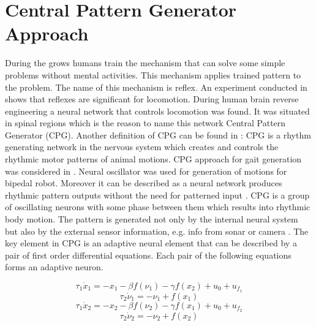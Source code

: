 \documentclass[12pt,a4paper]{report}
\begin{document}
	\section{Central Pattern Generator Approach}
		During the grows humans train the mechanism that can solve some simple problems without mental activities. This mechanism applies trained pattern to the problem. The name of this mechanism is reflex.
		An experiment conducted in \cite{grillner1975locomotion} shows that reflexes are significant for locomotion. During human brain reverse engineering a neural network that controls locomotion was found. It was situated in spinal regions which is the reason to name this network Central Pattern Generator (CPG).
		Another definition of CPG can be found in \cite{lee2007construction}: CPG is a rhythm generating network in the nervous system which creates and controls the rhythmic motor patterns of animal motions. CPG approach for gait generation was considered in \cite{miyakoshi1998three}. Neural oscillator was used for generation of motions for bipedal robot. Moreover it can be described as a neural network produces rhythmic pattern outputs without the need for patterned input \cite{wright2014intelligent}. CPG is a group of oscillating neurons with some phase between them which results into rhythmic body motion. The pattern is generated not only by the internal neural system but also by the external sensor information, e.g. info from sonar or camera \cite{miyakoshi1998three}. The key element in CPG is an adaptive neural element that can be described by a pair of first order differential equations. Each pair of the following equations forms an adaptive neuron.

		\begin{equation}\label{eq:CPG1}
			\tau_1 \dot{x}_1 = -x_1 - \beta f(\nu_1) -  \gamma f(x_2) + u_0 + u_{f_1}
		\end{equation}
		\begin{equation}\label{eq:CPG2}
			\tau_2 \dot{\nu}_1 = -\nu_1  + f(x_1)
		\end{equation}
		\begin{equation}\label{eq:CPG3}
			\tau_1 \dot{x}_2 = -x_2 - \beta f(\nu_2) -  \gamma f(x_1) + u_0 + u_{f_2}
		\end{equation}
		\begin{equation}\label{eq:CPG4}
			\tau_2 \dot{\nu}_2 = -\nu_2  + f(x_2)
		\end{equation}
\end{document}
